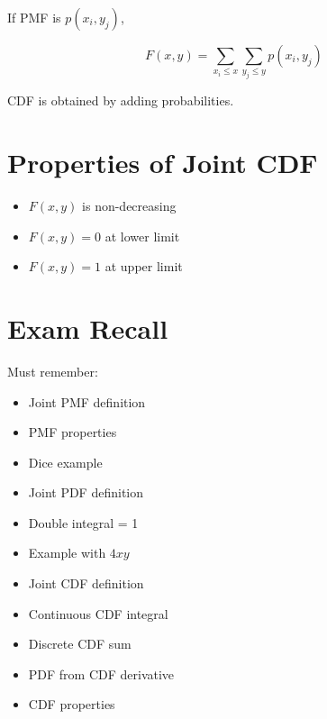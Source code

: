 \documentclass[12pt]{article}
\begin{document}
If PMF is $p(x_i,y_j)$,

\[
F(x,y)
=
\sum_{x_i \le x}
\sum_{y_j \le y}
p(x_i,y_j)
\]

CDF is obtained by adding probabilities.


\section{Properties of Joint CDF}

\begin{itemize}
\item $F(x,y)$ is non-decreasing
\item $F(x,y)=0$ at lower limit
\item $F(x,y)=1$ at upper limit
\end{itemize}


\section{Exam Recall}

Must remember:

\begin{itemize}
\item Joint PMF definition
\item PMF properties
\item Dice example
\item Joint PDF definition
\item Double integral = 1
\item Example with $4xy$
\item Joint CDF definition
\item Continuous CDF integral
\item Discrete CDF sum
\item PDF from CDF derivative
\item CDF properties
\end{itemize}
\end{document}
